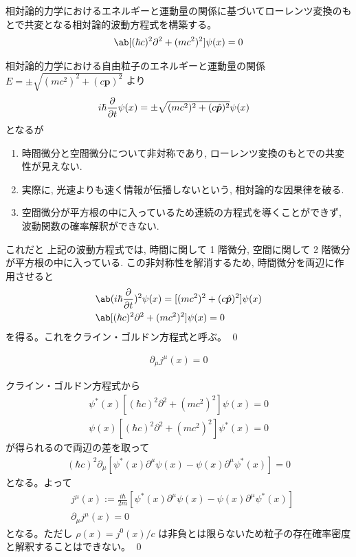 \documentclass[uplatex,dvipdfmx,a4paper,11pt]{jlreq}
\makeatletter
\newcommand{\pp}{\bm{p}}
\numberwithin{equation}{section}
\theoremstyle{definition}
\renewenvironment{proof}[1][\proofname]{\par
  \normalfont
  \topsep6\p@\@plus6\p@ \trivlist
  \item[\hskip\labelsep{\bfseries #1}\@addpunct{\bfseries}]\ignorespaces\quad\par
}{%
  \qed\endtrivlist\@endpefalse
}
\renewcommand\proofname{証明}
\makeatother
\begin{document}
\begin{theorem}
  相対論的力学におけるエネルギーと運動量の関係に基づいてローレンツ変換のもとで共変となる相対論的波動方程式を構築する。
  \begin{align}
    \ab[(\hbar c)^2\partial^2 + (mc^2)^2]\psi(x) = 0
  \end{align}
\end{theorem}
\begin{proof}
  相対論的力学における自由粒子のエネルギーと運動量の関係 $E = \pm\sqrt{(mc^2)^2 + (c\pp)^2}$ より
  \begin{align}
    i\hbar\diffp{}{t}\psi(x) & = \pm\sqrt{(mc^2)^2 + (c\hat{\pp})^2}\psi(x)
  \end{align}
  となるが
  \begin{enumerate}
    \item 時間微分と空間微分について非対称であり, ローレンツ変換のもとでの共変性が見えない.
    \item 実際に, 光速よりも速く情報が伝播しないという, 相対論的な因果律を破る.
    \item 空間微分が平方根の中に入っているため連続の方程式を導くことができず, 波動関数の確率解釈ができない.
  \end{enumerate}
  これだと
  上記の波動方程式では, 時間に関して 1 階微分, 空間に関して 2 階微分が平方根の中に入っている. この非対称性を解消するため, 時間微分を両辺に作用させると
  \begin{align}
     & \ab(i\hbar\diffp{}{t})^2\psi(x) = [(mc^2)^2 + (c\hat{\pp})^2]\psi(x) \\
     & \ab[(\hbar c)^2\partial^2 + (mc^2)^2]\psi(x) = 0
  \end{align}
  を得る。これをクライン・ゴルドン方程式と呼ぶ。
\end{proof}

\begin{theorem}[連続の方程式]
  \begin{align}
    \partial_\mu j^\mu(x) = 0
  \end{align}
\end{theorem}
\begin{proof}
  クライン・ゴルドン方程式から
  \begin{align}
    \psi^*(x)[(\hbar c)^2\partial^2 + (mc^2)^2]\psi(x) = 0 \\
    \psi(x)[(\hbar c)^2\partial^2 + (mc^2)^2]\psi^*(x) = 0
  \end{align}
  が得られるので両辺の差を取って
  \begin{align}
    (\hbar c)^2\partial_\mu[\psi^*(x)\partial^\mu\psi(x) - \psi(x)\partial^\mu\psi^*(x)] = 0
  \end{align}
  となる。よって
  \begin{align}
     & j^\mu(x) := \frac{i\hbar}{2m}[\psi^*(x)\partial^\mu\psi(x) - \psi(x)\partial^\mu\psi^*(x)] \\
     & \partial_\mu j^\mu(x) = 0
  \end{align}
  となる。ただし $\rho(x) = j^0(x)/c$ は非負とは限らないため粒子の存在確率密度と解釈することはできない。
\end{proof}
\end{document}
